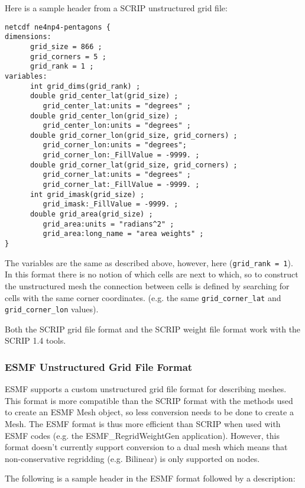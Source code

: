 Here is a sample header from a SCRIP unstructured grid file:

\begin{verbatim}
netcdf ne4np4-pentagons {
dimensions:
      grid_size = 866 ;
      grid_corners = 5 ;
      grid_rank = 1 ;
variables:
      int grid_dims(grid_rank) ;
      double grid_center_lat(grid_size) ;
         grid_center_lat:units = "degrees" ;
      double grid_center_lon(grid_size) ;
         grid_center_lon:units = "degrees" ;
      double grid_corner_lon(grid_size, grid_corners) ;
         grid_corner_lon:units = "degrees";
         grid_corner_lon:_FillValue = -9999. ;
      double grid_corner_lat(grid_size, grid_corners) ;
         grid_corner_lat:units = "degrees" ;
         grid_corner_lat:_FillValue = -9999. ;
      int grid_imask(grid_size) ;
         grid_imask:_FillValue = -9999. ;
      double grid_area(grid_size) ;
         grid_area:units = "radians^2" ;
         grid_area:long_name = "area weights" ;
}
\end{verbatim}

The variables are the same as described above, however, here ({\tt grid\_rank = 1}). In this format there
is no notion of which cells are next to which, so to construct the unstructured mesh the connection between
cells is defined by searching for cells with the same corner coordinates. (e.g. the same {\tt grid\_corner\_lat}
and {\tt grid\_corner\_lon} values).

Both the SCRIP grid file format and the SCRIP weight file format work with the SCRIP 1.4 tools.

\subsubsection{ESMF Unstructured Grid File Format}\label{sec:fileformat:esmf}

ESMF supports a custom unstructured grid file format for describing meshes. This format is more compatible than the SCRIP format with the methods used to create an ESMF Mesh object, so less conversion needs to be done to create a Mesh.
The ESMF format is thus more efficient than SCRIP when used with ESMF codes (e.g. the ESMF\_RegridWeightGen application). However, this
format doesn't currently support conversion to a dual mesh which means that non-conservative regridding (e.g. Bilinear) is only supported on nodes.

The following is a sample header in the ESMF format followed by a description:

